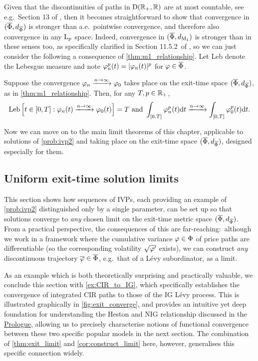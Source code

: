 Given that the discontinuities of paths in $\mathrm{D}(\mathbb{R}_+,\mathbb{R})$ are at most countable, see e.g.~Section 13 of \cite{billingsley_1999}, then it becomes straightforward to show that convergence in $(\overline{\Phi},d_{\overline{\Phi}})$ is stronger than a.e.~pointwise convergence, and therefore also convergence in any $\mathrm{L}_p$ space. Indeed, convergence in $(\overline{\Phi},d_{\mathrm{M}_1})$ is stronger than in these senses too, as specifically clarified in Section 11.5.2~of \cite{whitt_2002}, so we can just consider the following a consequence of \autoref{thm:m1_relationship}. Let Leb denote the Lebesgue measure and note $\varphi_n^p(t)=|\varphi_n(t)|^p$ for $\varphi\in\overline{\Phi}$.

\begin{corollary}\label{cor:ae_converge}
    Suppose the convergence $\varphi_n\xrightarrow{n\to\infty}\varphi_0$ takes place on the exit-time space $(\overline{\Phi},d_{\overline{\Phi}})$, as in \autoref{thm:m1_relationship}. Then, for any $T,p\in\mathbb{R}_+$,
    \begin{equation}
        \mathrm{Leb}\left[t\in[0,T]:\varphi_n(t)\xrightarrow{n\to\infty}\varphi_0(t)\right]=T \text{ and } \int_{[0,T]}\varphi^p_n(t)\mathrm{d} t \xrightarrow{n\to\infty}\int_{[0,T]}\varphi^p_0(t)\mathrm{d} t.
    \end{equation}
\end{corollary}

Now we can move on to the main limit theorems of this chapter, applicable to solutions of \autoref{prob:ivp2} and taking place on the exit-time space $(\overline{\Phi},d_{\overline{\Phi}})$, designed especially for them.

\subsection{Uniform exit-time solution limits}\label{sec:bounds_limits}

This section shows how sequences of IVPs, each providing an example of \autoref{prob:ivp2} distinguished only by a single parameter, can be set up so that solutions converge to \emph{any} chosen limit on the exit-time metric space $(\overline{\Phi},d_{\overline{\Phi}})$. From a practical perspective, the consequences of this are far-reaching:~although we work in a framework where the cumulative variance $\varphi\in\Phi$ of price paths are differentiable (so the corresponding volatility $\sqrt{\varphi'}$ exists), we can construct \emph{any} discontinuous trajectory $\overline{\varphi}\in\overline{\Phi}$, e.g.~that of a L\'evy subordinator, as a limit.

As an example which is both theoretically surprising and practically valuable, we conclude this section with \autoref{ex:CIR_to_IG}, which specifically establishes the convergence of integrated CIR paths to those of the IG L\'evy process. This is illustrated graphically in \autoref{fig:exit_converge}, and provides an intuitive yet deep foundation for understanding the Heston and NIG relationship discussed in the \hyperlink{prologue}{Prologue}, allowing us to precisely characterise notions of functional convergence between these two specific popular models in the next section. The combination of \autoref{thm:exit_limit} and \autoref{cor:construct_limit} here, however, generalises this specific connection widely.

